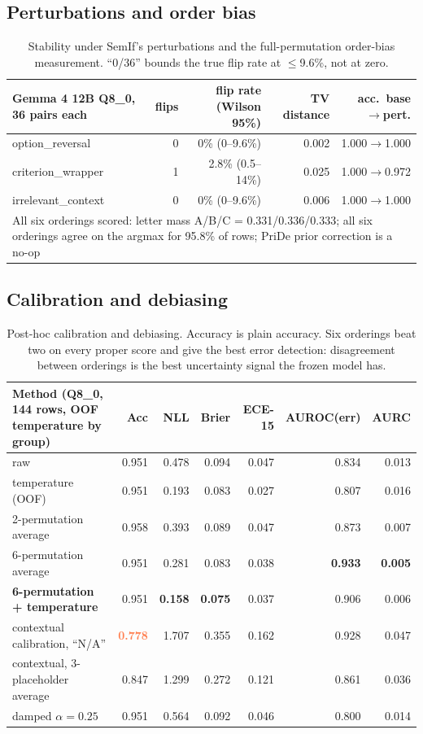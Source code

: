 \documentclass[11pt,a4paper]{article}
\newcommand{\hl}[1]{\textcolor{coral}{\textbf{#1}}}
\begin{document}
\subsection{Perturbations and order bias}
\begin{table}[H]
\centering\small
\begin{tabular}{l r r r r}
\toprule
Gemma 4 12B Q8\_0, 36 pairs each & flips & flip rate (Wilson 95\%) & TV distance & acc.\ base$\to$pert. \\
\midrule
option\_reversal & 0 & 0\% (0--9.6\%) & 0.002 & 1.000$\to$1.000 \\
criterion\_wrapper & 1 & 2.8\% (0.5--14\%) & 0.025 & 1.000$\to$0.972 \\
irrelevant\_context & 0 & 0\% (0--9.6\%) & 0.006 & 1.000$\to$1.000 \\
\midrule
\multicolumn{5}{p{140mm}}{All six orderings scored: letter mass A/B/C = 0.331/0.336/0.333; all six orderings agree on the argmax for 95.8\% of rows; PriDe prior correction is a no-op} \\
\bottomrule
\end{tabular}
\caption{Stability under SemIf's perturbations and the full-permutation order-bias measurement. ``0/36'' bounds the true flip rate at $\le$9.6\%, not at zero.}
\end{table}

\subsection{Calibration and debiasing}
\label{sec:calib}
\begin{table}[H]
\centering\small
\begin{tabular}{l r r r r r r}
\toprule
Method (Q8\_0, 144 rows, OOF temperature by group) & Acc & NLL & Brier & ECE-15 & AUROC(err) & AURC \\
\midrule
raw & 0.951 & 0.478 & 0.094 & 0.047 & 0.834 & 0.013 \\
temperature (OOF) & 0.951 & 0.193 & 0.083 & 0.027 & 0.807 & 0.016 \\
2-permutation average & 0.958 & 0.393 & 0.089 & 0.047 & 0.873 & 0.007 \\
6-permutation average & 0.951 & 0.281 & 0.083 & 0.038 & \textbf{0.933} & \textbf{0.005} \\
\textbf{6-permutation + temperature} & 0.951 & \textbf{0.158} & \textbf{0.075} & 0.037 & 0.906 & 0.006 \\
contextual calibration, ``N/A'' \cite{zhao} & \hl{0.778} & 1.707 & 0.355 & 0.162 & 0.928 & 0.047 \\
contextual, 3-placeholder average & 0.847 & 1.299 & 0.272 & 0.121 & 0.861 & 0.036 \\
\quad damped $\alpha=0.25$ & 0.951 & 0.564 & 0.092 & 0.046 & 0.800 & 0.014 \\
\bottomrule
\end{tabular}
\caption{Post-hoc calibration and debiasing. Accuracy is plain accuracy. Six orderings beat two on every proper score and give the best error detection: disagreement between orderings is the best uncertainty signal the frozen model has.}
\label{tab:calib}
\end{table}
\end{document}
